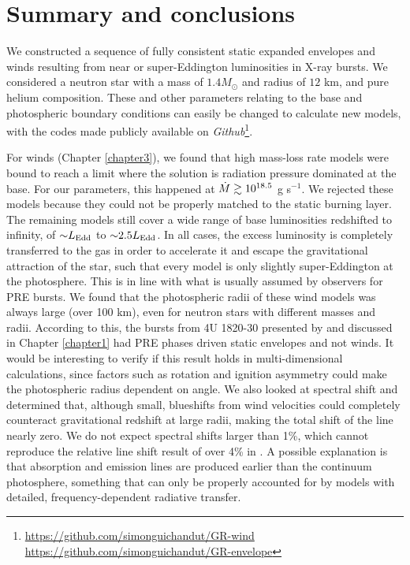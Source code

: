 \documentclass[../main.tex]{subfiles}
\begin{document}
\chapter{Summary and conclusions}\label{chapter6}
We constructed a sequence of fully consistent static expanded envelopes and winds resulting from near or super-Eddington luminosities in X-ray bursts. We considered a neutron star with a mass of $1.4M_\odot$ and radius of $12$ km, and pure helium composition. These and other parameters relating to the base and photospheric boundary conditions can easily be changed to calculate new models, with the codes made publicly available on \textit{Github}\footnote{\url{https://github.com/simonguichandut/GR-wind}\\\hspace*{0.6cm}\url{https://github.com/simonguichandut/GR-envelope}}. 

For winds (Chapter \ref{chapter3}), we found that high mass-loss rate models were bound to reach a limit where the solution is radiation pressure dominated at the base. For our parameters, this happened at $\dot{M}\gtrsim 10^{18.5}$ g s$^{-1}$. We rejected these models because they could not be properly matched to the static burning layer. The remaining models still cover a wide range of base luminosities redshifted to infinity, of ${\sim}L_\text{Edd}$ to ${\sim}2.5L_\text{Edd}$. In all cases, the excess luminosity is completely transferred to the gas in order to accelerate it and escape the gravitational attraction of the star, such that every model is only slightly super-Eddington at the photosphere. This is in line with what is usually assumed by observers for PRE bursts.
We found that the photospheric radii of these wind models was always large (over 100 km), even for neutron stars with different masses and radii. According to this, the bursts from 4U 1820-30 presented by \citet{Strohmayer2019} and discussed in Chapter \ref{chapter1} had PRE phases driven static envelopes and not winds. It would be interesting to verify if this result holds in multi-dimensional calculations, since factors such as rotation and ignition asymmetry could make the photospheric radius dependent on angle. We also looked at spectral shift and determined that, although small, blueshifts from wind velocities could completely counteract gravitational redshift at large radii, making the total shift of the line nearly zero. We do not expect spectral shifts larger than 1\%, which cannot reproduce the relative line shift result of over 4\% in \citet{Strohmayer2019}. A possible explanation is that absorption and emission lines are produced earlier than the continuum photosphere, something that can only be properly accounted for by models with detailed, frequency-dependent radiative transfer. 
\end{document}
